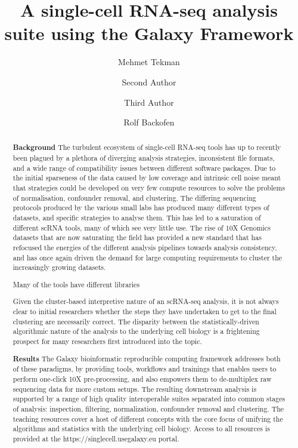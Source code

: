 \documentclass[a4paper,num-refs]{oup-contemporary}
\title{A single-cell RNA-seq analysis suite using the Galaxy Framework}
\author[1,\authfn{1},\authfn{2}]{Mehmet Tekman}
\author[2,\authfn{1},\authfn{2}]{Second Author}
\author[2]{Third Author}
\author[1,\authfn{1}]{Rolf Backofen}
\affil[1]{Chair of Bioinformatics, University of Freiburg, Freiburg, Germany, }
\affil[2]{Second Institution}
\begin{document}
\begin{frontmatter}
\maketitle
\begin{abstract}
\textbf{Background} The turbulent ecosystem of single-cell RNA-seq tools has up to recently been plagued by a plethora of diverging analysis strategies, inconsistent file formats, and a wide range of compatibility issues between different software packages. Due to the initial sparseness of the data caused by low coverage and intrinsic cell noise meant that strategies could be developed on very few compute resources to solve the problems of normalisation, confounder removal, and clustering. The differing sequencing protocols produced by the various small labs has produced many different types of datasets, and specific strategies to analyse them. This has led to a saturation of different scRNA tools, many of which see very little use. The rise of 10X Genomics datasets that are now saturating the field has provided a new standard that has refocused the energies of the different analysis pipelines towards analysis consistency, and has once again driven the demand for large computing requirements to cluster the increasingly growing datasets.

Many of the tools have different libraries

Given the cluster-based interpretive nature of an scRNA-seq analysis, it is not always clear to initial researchers whether the steps they have undertaken to get to the final clustering are necessarily correct. The disparity between the statistically-driven algorithmic nature of the analysis to the underlying cell biology is a frightening prospect for many researchers first introduced into the topic.

\textbf{Results}
The Galaxy bioinformatic reproducible computing framework addresses both of these paradigms, by providing tools, workflows and trainings that enables users to perform one-click 10X pre-processing, and also empowers them to de-multiplex raw sequencing data for more custom setups. The resulting downstream analysis is supported by a range of high quality interoperable suites separated into common stages of analysis: inspection, filtering, normalization, confounder removal and clustering. The teaching resources cover a host of different concepts with the core focus of unifying the algorithms and statistics with the underlying cell biology. Access to all resources is provided at the https://singlecell.usegalaxy.eu portal.


\end{abstract}
\end{frontmatter}
\end{document}
